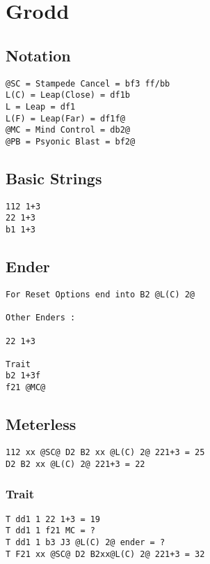 \documentclass[main.tex]{subfiles}
\begin{document}
\chapter{Grodd}

\section{Notation}
\begin{lstlisting}[language=FG]
@SC = Stampede Cancel = bf3 ff/bb
L(C) = Leap(Close) = df1b
L = Leap = df1
L(F) = Leap(Far) = df1f@
@MC = Mind Control = db2@
@PB = Psyonic Blast = bf2@
\end{lstlisting}


\section{Basic Strings}

\begin{lstlisting}[language=FG]
112 1+3
22 1+3
b1 1+3
\end{lstlisting}


\section{Ender}

\begin{lstlisting}[language=FG]
For Reset Options end into B2 @L(C) 2@ 

Other Enders :

22 1+3

Trait
b2 1+3f
f21 @MC@
\end{lstlisting}

\section{Meterless}


\begin{lstlisting}[language=FG]
112 xx @SC@ D2 B2 xx @L(C) 2@ 221+3 = 25
D2 B2 xx @L(C) 2@ 221+3 = 22
\end{lstlisting}

\subsection{Trait}

\begin{lstlisting}[language=FG]
T dd1 1 22 1+3 = 19
T dd1 1 f21 MC = ?
T dd1 1 b3 J3 @L(C) 2@ ender = ?
T F21 xx @SC@ D2 B2xx@L(C) 2@ 221+3 = 32
\end{lstlisting}
\end{document}

